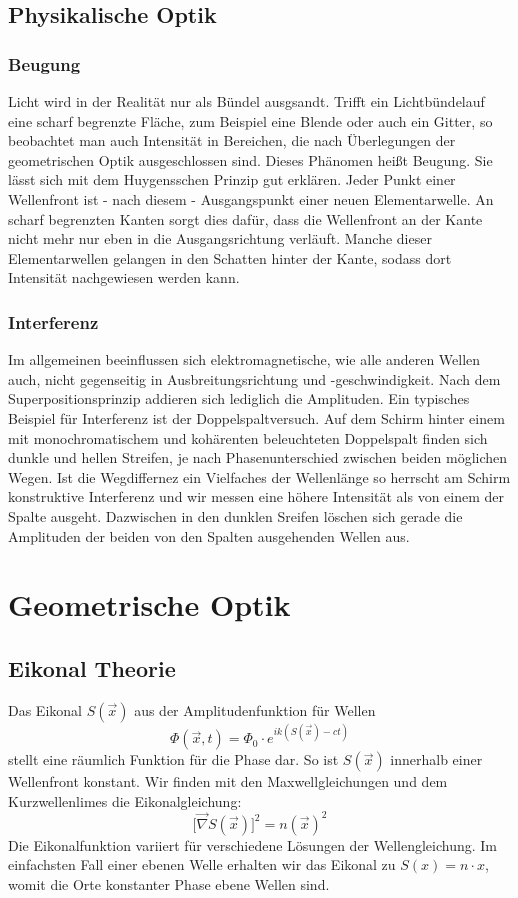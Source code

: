\documentclass[twoside,colorback,accentcolor=tud4c,11pt]{tudreport}
\begin{document}
\subsection{Physikalische Optik}
		\subsubsection{Beugung}
			Licht wird in der Realität nur als Bündel ausgsandt. Trifft ein Lichtbündelauf eine scharf begrenzte Fläche, zum Beispiel eine Blende oder auch ein Gitter, so beobachtet man auch Intensität in Bereichen, die nach Überlegungen der geometrischen Optik ausgeschlossen sind. Dieses Phänomen heißt Beugung. Sie lässt sich mit dem Huygensschen Prinzip gut erklären. Jeder Punkt einer Wellenfront ist - nach diesem - Ausgangspunkt einer neuen Elementarwelle. An scharf begrenzten Kanten sorgt dies dafür, dass die Wellenfront an der Kante nicht mehr nur eben in die Ausgangsrichtung verläuft. Manche dieser Elementarwellen gelangen in den Schatten hinter der Kante, sodass dort Intensität nachgewiesen werden kann.
			\subsubsection{Interferenz}
			Im allgemeinen beeinflussen sich elektromagnetische, wie alle anderen Wellen auch, nicht gegenseitig in Ausbreitungsrichtung und -geschwindigkeit. Nach dem Superpositionsprinzip addieren sich lediglich die Amplituden. Ein typisches Beispiel für Interferenz ist der Doppelspaltversuch. Auf dem Schirm hinter einem mit monochromatischem und kohärenten beleuchteten Doppelspalt finden sich dunkle und hellen Streifen, je nach Phasenunterschied zwischen beiden möglichen Wegen. Ist die Wegdiffernez ein Vielfaches der Wellenlänge so herrscht am Schirm konstruktive Interferenz und wir messen eine höhere Intensität als von einem der Spalte ausgeht. Dazwischen in den dunklen Sreifen löschen sich gerade die Amplituden der beiden von den Spalten ausgehenden Wellen aus.
\section{Geometrische Optik}
\subsection{Eikonal Theorie}
		Das Eikonal $S \left( \vec{x} \right)$ aus der Amplitudenfunktion für Wellen 
		\[
		\Phi \left( \vec{x} , t \right) = \Phi_0 \cdot e^{ik\left(S \left( \vec{x} \right)-ct\right)}
		\]
		stellt eine räumlich Funktion für die Phase dar. So ist $S\left( \vec{x} \right)$ innerhalb einer Wellenfront konstant. Wir finden mit den Maxwellgleichungen und dem Kurzwellenlimes die Eikonalgleichung:
		\[
		\lbrack \vec{\nabla} S\left( \vec{x} \right) \rbrack ^2 = n\left(\vec{x} \right)^2
		\]
		Die Eikonalfunktion variiert für verschiedene Lösungen der Wellengleichung. Im einfachsten Fall einer ebenen Welle erhalten wir das Eikonal zu $S\left(x\right)= n\cdot x$, womit die Orte konstanter Phase ebene Wellen sind.
		
\end{document}
